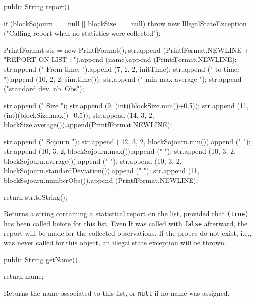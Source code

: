 \begin{code}

   public String report() \begin{hide}  {
        if (blockSojourn == null || blockSize == null)
            throw new IllegalStateException
                ("Calling report when no statistics were collected");

        PrintfFormat str = new PrintfFormat();
        str.append (PrintfFormat.NEWLINE +
            "REPORT ON LIST : ").append (name).append (PrintfFormat.NEWLINE);
        str.append ("   From time: ").append (7, 2, 2, initTime);
        str.append (" to time: ").append (10, 2, 2, sim.time());
        str.append ("                  min        max      average  ");
        str.append ("standard dev.  nb. Obs");

        str.append ("   Size    ");
        str.append (9, (int)(blockSize.min()+0.5));
        str.append (11, (int)(blockSize.max()+0.5));
        str.append (14, 3, 2, blockSize.average()).append(PrintfFormat.NEWLINE);

        str.append ("   Sojourn ");
        str.append ( 12, 3, 2, blockSojourn.min()).append (" ");
        str.append (10, 3, 2, blockSojourn.max()).append (" ");
        str.append (10, 3, 2, blockSojourn.average()).append (" ");
        str.append (10, 3, 2, blockSojourn.standardDeviation()).append (" ");
        str.append (11, blockSojourn.numberObs()).append (PrintfFormat.NEWLINE);

        return str.toString();
    }\end{hide}
\end{code}
  \begin{tabb}  Returns a string containing a statistical report on the list,
   provided that  \texttt{(true)} has been
   called before for this list.
   Even If  was called with \texttt{false}
   afterward, the report will be made for
   the collected observations.
   If the probes do not exist, i.e.,  was never called
   for this object, an illegal state exception will be thrown.
  \end{tabb}
\begin{htmlonly}
\end{htmlonly}
\begin{code}

   public String getName()\begin{hide} {
      return name;
   }\end{hide}
\end{code}
\begin{tabb}   Returns the name associated to this list,
  or \texttt{null} if no name was assigned.
\end{tabb}
\begin{htmlonly}
\end{htmlonly}

